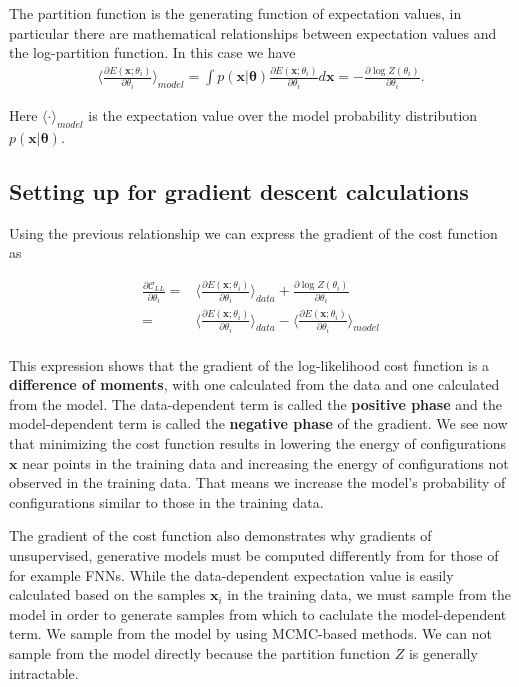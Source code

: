 \documentclass[%
oneside,                 %
final,                   %
10pt]{article}
\begin{document}
The partition function is the generating function of
expectation values, in particular there are mathematical relationships
between expectation values and the log-partition function. In this
case we have
\begin{align}
	\langle \frac{ \partial E(\bm{x}; \theta_i) } { \partial \theta_i} \rangle_{model}
	= \int p(\bm{x}| \bm{\theta}) \frac{ \partial E(\bm{x}; \theta_i) } { \partial \theta_i} d\bm{x} 
	= -\frac{\partial \log Z(\theta_i)}{ \partial  \theta_i} .
\end{align}

Here $\langle \cdot \rangle_{model}$ is the expectation value over the model probability distribution $p(\bm{x}| \bm{\theta})$.

\subsection{Setting up for gradient descent calculations}

Using the previous relationship we can express the gradient of the cost function as

\begin{align}
	\frac{\partial \mathcal{C}_{LL}}{\partial \theta_i}
	=& \langle \frac{ \partial E(\bm{x}; \theta_i) } { \partial \theta_i} \rangle_{data} + \frac{\partial \log Z(\theta_i)}{ \partial  \theta_i} \\
	=& \langle \frac{ \partial E(\bm{x}; \theta_i) } { \partial \theta_i} \rangle_{data} - \langle \frac{ \partial E(\bm{x}; \theta_i) } { \partial \theta_i} \rangle_{model} \\
\end{align}

This expression shows that the gradient of the log-likelihood cost
function is a \textbf{difference of moments}, with one calculated from
the data and one calculated from the model. The data-dependent term is
called the \textbf{positive phase} and the model-dependent term is
called the \textbf{negative phase} of the gradient. We see now that
minimizing the cost function results in lowering the energy of
configurations $\bm{x}$ near points in the training data and
increasing the energy of configurations not observed in the training
data. That means we increase the model's probability of configurations
similar to those in the training data.


The gradient of the cost function also demonstrates why gradients of
unsupervised, generative models must be computed differently from for
those of for example FNNs. While the data-dependent expectation value
is easily calculated based on the samples $\bm{x}_i$ in the training
data, we must sample from the model in order to generate samples from
which to caclulate the model-dependent term. We sample from the model
by using MCMC-based methods. We can not sample from the model directly
because the partition function $Z$ is generally intractable.
\end{document}
